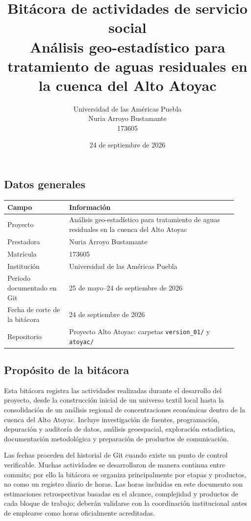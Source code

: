 \documentclass[
  spanish,
]{article}
\title{\textbf{Bitácora de actividades de servicio social}\\[8pt]
\large Análisis geo-estadístico para tratamiento de aguas residuales en la cuenca del Alto Atoyac}
\author{Universidad de las Américas Puebla\\[10pt]
Nuria Arroyo Bustamante\\173605}
\date{24 de septiembre de 2026}
\newcounter{none} %
\begin{document}
\maketitle

\subsection{Datos generales}\label{datos-generales}

{\def\LTcaptype{none} %
\begin{longtable}[]{@{}p{0.25\linewidth}p{0.68\linewidth}@{}}
\toprule\noalign{}
Campo & Información \\
\midrule\noalign{}
\endhead
\bottomrule\noalign{}
\endlastfoot
Proyecto & Análisis geo-estadístico para tratamiento de aguas residuales
en la cuenca del Alto Atoyac \\
Prestadora & Nuria Arroyo Bustamante \\
Matrícula & 173605 \\
Institución & Universidad de las Américas Puebla \\
Periodo documentado en Git & 25 de mayo--24 de septiembre de 2026 \\
Fecha de corte de la bitácora & 24 de septiembre de 2026 \\
Repositorio & Proyecto Alto Atoyac: carpetas \texttt{version\_01/} y
\texttt{atoyac/} \\
\end{longtable}
}

\subsection{Propósito de la
bitácora}\label{propuxf3sito-de-la-bituxe1cora}

Esta bitácora registra las actividades realizadas durante el desarrollo
del proyecto, desde la construcción inicial de un universo textil local
hasta la consolidación de un análisis regional de concentraciones
económicas dentro de la cuenca del Alto Atoyac. Incluye investigación de
fuentes, programación, depuración y auditoría de datos, análisis
geoespacial, exploración estadística, documentación metodológica y
preparación de productos de comunicación.

Las fechas proceden del historial de Git cuando existe un punto de
control verificable. Muchas actividades se desarrollaron de manera
continua entre commits; por ello la bitácora se organiza principalmente
por etapas y productos, no como un registro diario de horas. Las horas
incluidas en este documento son estimaciones retrospectivas basadas en
el alcance, complejidad y productos de cada bloque de trabajo; deberán
validarse con la coordinación institucional antes de emplearse como
horas oficialmente acreditadas.
\end{document}
